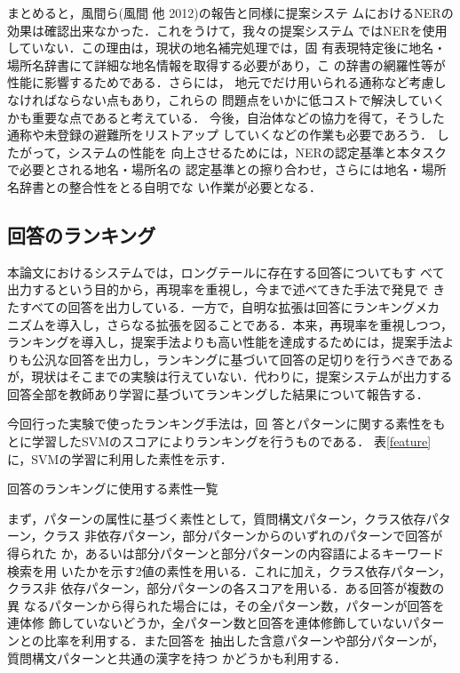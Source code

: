 \documentclass[japanese]{jnlp_1.4}
\begin{document}
    まとめると，風間ら(風間 他 2012)の報告と同様に提案システ
ムにおけるNERの効果は確認出来なかった．これをうけて，我々の提案システム
ではNERを使用していない．この理由は，現状の地名補完処理では，固
有表現特定後に地名・場所名辞書にて詳細な地名情報を取得する必要があり，こ
の辞書の網羅性等が性能に影響するためである．さらには，
地元でだけ用いられる通称など考慮しなければならない点もあり，これらの
問題点をいかに低コストで解決していくかも重要な点であると考えている．
今後，自治体などの協力を得て，そうした通称や未登録の避難所をリストアップ
していくなどの作業も必要であろう．
したがって，システムの性能を
向上させるためには，NERの認定基準と本タスクで必要とされる地名・場所名の
認定基準との擦り合わせ，さらには地名・場所名辞書との整合性をとる自明でな
い作業が必要となる．


\subsection{回答のランキング}

本論文におけるシステムでは，ロングテールに存在する回答についてもす
べて出力するという目的から，再現率を重視し，今まで述べてきた手法で発見で
きたすべての回答を出力している．一方で，自明な拡張は回答にランキングメカ
ニズムを導入し，さらなる拡張を図ることである．本来，再現率を重視しつつ，
ランキングを導入し，提案手法よりも高い性能を達成するためには，提案手法よ
りも公汎な回答を出力し，ランキングに基づいて回答の足切りを行うべきである
が，現状はそこまでの実験は行えていない．代わりに，提案システムが出力する
回答全部を教師あり学習に基づいてランキングした結果について報告する．

今回行った実験で使ったランキング手法は，回
答とパターンに関する素性をもとに学習したSVMのスコアによりランキングを行うものである．
表\ref{feature}に，SVMの学習に利用した素性を示す．

\begin{table}[b]
\caption{回答のランキングに使用する素性一覧}
\label{feature}

\end{table}

まず，パターンの属性に基づく素性として，質問構文パターン，クラス依存パターン，クラス
非依存パターン，部分パターンからのいずれのパターンで回答が得られた
か，あるいは部分パターンと部分パターンの内容語によるキーワード検索を用
いたかを示す2値の素性を用いる．これに加え，クラス依存パターン，クラス非
依存パターン，部分パターンの各スコアを用いる．ある回答が複数の異
なるパターンから得られた場合には，その全パターン数，パターンが回答を連体修
飾していないどうか，全パターン数と回答を連体修飾していないパターンとの比率を利用する．また回答を
抽出した含意パターンや部分パターンが，質問構文パターンと共通の漢字を持つ
かどうかも利用する．
\end{document}
